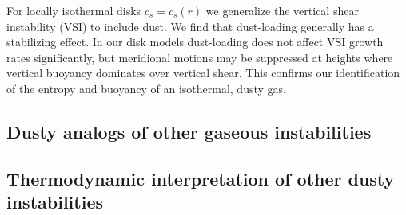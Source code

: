 
For locally isothermal disks $c_s=c_s(r)$ we generalize the vertical
shear instability (VSI) to include dust. We find that dust-loading
generally has a stabilizing effect. In our disk models
dust-loading does not affect VSI growth rates significantly, but
meridional motions may be suppressed at heights where vertical 
buoyancy dominates over vertical shear. This confirms our 
identification of the entropy and buoyancy of an isothermal, dusty
gas.  


\subsection{Dusty analogs of other gaseous instabilities} 



\subsection{Thermodynamic interpretation of other dusty instabilities}


